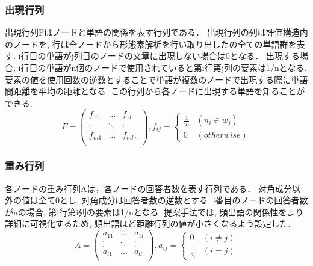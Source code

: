 \documentclass[syuuron]{kuee}
\begin{document}
			\subsubsection{出現行列}
				出現行列Fはノードと単語の関係を表す行列である．
				出現行列の列は評価構造内のノードを, 行は全ノードから形態素解析を行い取り出したの全ての単語群を表す. 
				i行目の単語がj列目のノードの文章に出現しない場合は0となる．
				出現する場合, i行目の単語がn個のノードで使用されていると第i行第j列の要素は1/nとなる. 
				要素の値を使用回数の逆数とすることで単語が複数のノードで出現する際に単語間距離を平均の距離となる. 
				この行列から各ノードに出現する単語を知ることができる. 
				\begin{equation}
				 	F = \left(
				    \begin{array}{cccc}
				    	f_{11} & \ldots & f_{1l} \\
				    	\vdots & \ddots & \vdots \\
				    	f_{m1} & \ldots & f_{ml}, \\ 
					\end{array}
					\right), 
				 	f_{ij} = \left\{ \begin{array}{ll}
						\frac{1}{u_i} & (n_i \in w_j) \\
				    	0 & (otherwise)
				  	\end{array} 
				  	\right.
				\end{equation}
				
			\subsubsection{重み行列}
				各ノードの重み行列Aは，各ノードの回答者数を表す行列である．
				対角成分以外の値は全て0とし, 対角成分は回答者数の逆数とする. 
				i番目のノードの回答者数がnの場合, 第i行第i列の要素は1/nとなる. 
				提案手法では, 頻出語の関係性をより詳細に可視化するため, 頻出語ほど距離行列の値が小さくなるよう設定した. 
				\begin{equation}
				 A = \left(
				    \begin{array}{cccc}
				    	a_{11} & \ldots & a_{1l} \\
				    	\vdots & \ddots & \vdots \\
				    	a_{l1} & \ldots & a_{ll} \\
					\end{array}
				 \right),
				 a_{ij} = \left\{ \begin{array}{ll}
				     0 & (i ≠ j) \\
				     \frac{1}{a_i} & (i = j)
				  \end{array} \right.
				\end{equation}
\end{document}
